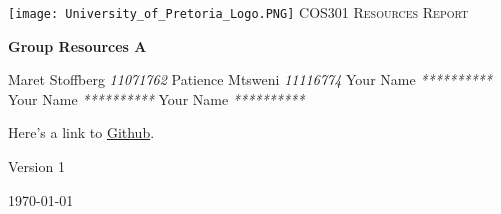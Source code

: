 \begin{titlepage}
\begin{center}
\texttt{[image: University\_of\_Pretoria\_Logo.PNG]}\newline
\textsc{\LARGE COS301 Resources Report}\newline


\textbf{Group Resources A} \\
\begin{flushright} \large
Maret Stoffberg \emph{11071762} \newline
Patience Mtsweni \emph{11116774} \newline
Your Name \emph{**********} \newline
Your Name \emph{**********} \newline
Your Name \emph{**********} \newline \newline \newline
\end{flushright}
Here's a link to \href{https://github.com/MaretStoffberg/COS301_phase3_ResourcesA}{Github}.


\vfill

{\large Version 1}

{\large \today}

\end{center}
\end{titlepage}
